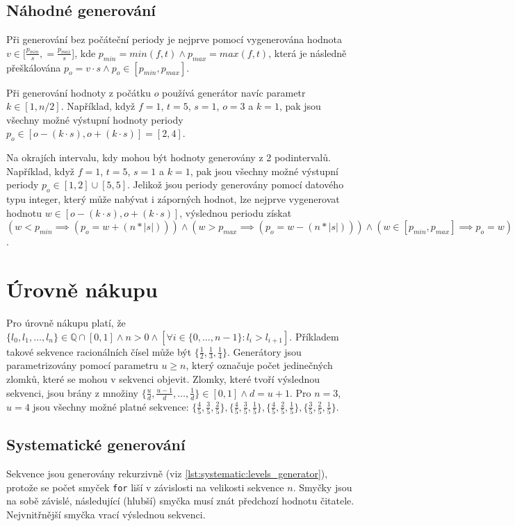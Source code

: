 \subsection{Náhodné generování}
Při generování bez počáteční periody je nejprve pomocí  vygenerována hodnota $ v \in [\frac{p_{min}}{s}, = \frac{p_{max}}{s}$], kde $p_{min}=min(f, t) \land p_{max}=max(f, t)$, která je následně přeškálována $p_o=v\cdot s \land p_o \in [p_{min}, p_{max}]$.

Při generování hodnoty z počátku $o$ používá generátor navíc parametr $k\in[1,n/2]$.
Například, když $f=1$, $t=5$, $s=1$, $o=3$ a $k=1$, pak jsou všechny možné výstupní hodnoty periody $ p_o \in [o-(k\cdot s), o+(k\cdot s)]=[2, 4]$.

Na okrajích intervalu, kdy mohou být hodnoty generovány z 2 podintervalů. Například, když $f=1$, $t=5$, $s=1$ a $k=1$, pak jsou všechny možné výstupní periody $p_o \in [1, 2] \cup [5, 5]$.
Jelikož jsou periody generovány pomocí datového typu integer, který může nabývat i záporných hodnot, lze nejprve vygenerovat hodnotu $ w \in [o-(k\cdot s), o+(k\cdot s)]$, výslednou periodu získat $(w<p_{min}\implies(p_o=w+(n*|s|))) \land (w>p_{max}\implies(p_o=w-(n*|s|))) \land (w \in [p_{min}, p_{max}]\implies p_o=w)$.

\section{Úrovně nákupu}
Pro úrovně nákupu platí, že $\{l_0, l_1,\dots,l_n\} \in \mathbb{Q} \cap [0, 1] \land n>0 \land [\forall i \in \{0,\dots,n-1\} : l_i > l_{i+1}]$.
Příkladem takové sekvence racionálních čísel může být $\{\frac{1}{2}, \frac{1}{3}, \frac{1}{4}\}$.
Generátory jsou parametrizovány pomocí parametru $u\geq n$, který označuje počet jedinečných zlomků, které se mohou v sekvenci objevit.
Zlomky, které tvoří výslednou sekvenci, jsou brány z množiny $\{\frac{u}{d}, \frac{u-1}{d},\dots, \frac{1}{d}\} \in [0, 1] \land d=u+1$.
Pro $n=3$, $u=4$ jsou všechny možné platné sekvence: $\{\frac{4}{5}, \frac{3}{5}, \frac{2}{5}\}, \{\frac{4}{5}, \frac{3}{5}, \frac{1}{5}\}, \{\frac{4}{5}, \frac{2}{5}, \frac{1}{5}\}, \{\frac{3}{5}, \frac{2}{5}, \frac{1}{5}\}$.

\subsection{Systematické generování}
Sekvence jsou generovány rekurzivně (viz \ref{lst:systematic:levels_generator}), protože se počet smyček \texttt{for} liší v závislosti na velikosti sekvence $n$.
Smyčky jsou na sobě závislé, následující (hlubší) smyčka musí znát předchozí hodnotu čitatele.
Nejvnitřnější smyčka vrací výslednou sekvenci.

